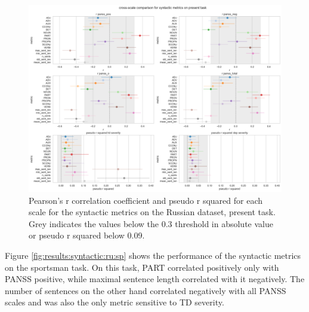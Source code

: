 \begin{figure}[ht!]
    \includegraphics[width=1.1\textwidth, center]{Figures/chapter_4/syntactic/ru_present_scale_r.png} 
\caption[Syntactic Metrics: Russian, Present Task]{\label{fig:results:syntactic:ru:pr} Pearson's r correlation coefficient and pseudo r squared for each scale for the syntactic metrics on the Russian dataset, present task. Grey indicates the values below the 0.3 threshold in absolute value or pseudo r squared below 0.09.}
\end{figure}

\clearpage
Figure \ref{fig:results:syntactic:ru:sp} shows the performance of the syntactic metrics on the sportsman task. On this task, PART correlated positively only with PANSS positive, while maximal sentence length correlated with it negatively. The number of sentences on the other hand correlated negatively with all PANSS scales and was also the only metric sensitive to TD severity.

